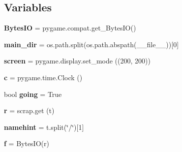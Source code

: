 \subsection*{Variables}
\begin{DoxyCompactItemize}
\item 
\mbox{\label{namespacepygame_1_1examples_1_1scrap__clipboard_ab179e940d6d2c9c897db62cd3720c650}} 
{\bfseries Bytes\+IO} = pygame.\+compat.\+get\+\_\+\+Bytes\+IO()
\item 
\mbox{\label{namespacepygame_1_1examples_1_1scrap__clipboard_a83922f4a7ec8ca62c990a4b38640ca24}} 
{\bfseries main\+\_\+dir} = os.\+path.\+split(os.\+path.\+abspath(\+\_\+\+\_\+file\+\_\+\+\_\+))\mbox{[}0\mbox{]}
\item 
\mbox{\label{namespacepygame_1_1examples_1_1scrap__clipboard_ada7a263d0533505269d2294513e124e2}} 
{\bfseries screen} = pygame.\+display.\+set\+\_\+mode ((200, 200))
\item 
\mbox{\label{namespacepygame_1_1examples_1_1scrap__clipboard_a495c6245af08a818c39e4c23ae1309ae}} 
{\bfseries c} = pygame.\+time.\+Clock ()
\item 
\mbox{\label{namespacepygame_1_1examples_1_1scrap__clipboard_a9aa67bf37904e26069529db35834e48a}} 
bool {\bfseries going} = True
\item 
\mbox{\label{namespacepygame_1_1examples_1_1scrap__clipboard_a21ec4a820db331779f6a105c5b47870e}} 
{\bfseries r} = scrap.\+get (t)
\item 
\mbox{\label{namespacepygame_1_1examples_1_1scrap__clipboard_ad42582fed303b50cb474af223ddf0356}} 
{\bfseries namehint} = t.\+split(\char`\"{}/\char`\"{})\mbox{[}1\mbox{]}
\item 
\mbox{\label{namespacepygame_1_1examples_1_1scrap__clipboard_a34160ba413f2594f81801c6d982f9ae3}} 
{\bfseries f} = Bytes\+IO(r)

\end{DoxyCompactItemize}
